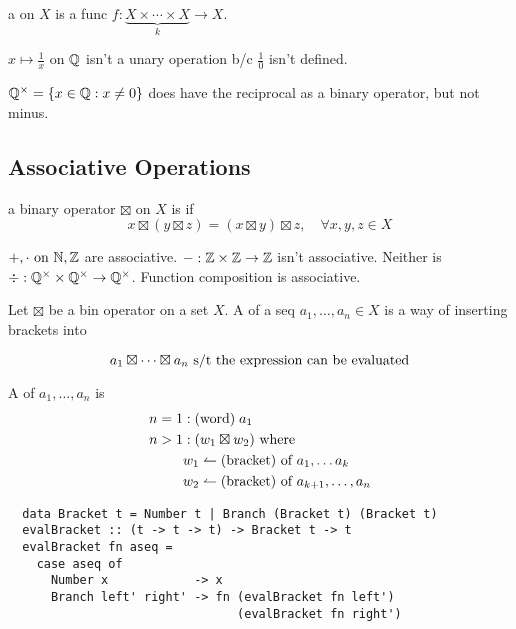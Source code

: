 \documentclass[12pt]{article}
\newcommand{\gop}[0]{\boxtimes}
\begin{document}
\bbox
\begin{defn}
  a  on \(X\) is a func \(f:\underset k{\underbrace{
  X\times\cdots\times X}}\to X\).
\end{defn}
\ebox

\bboxnote
\(x\mapsto\frac1x\) on \(\mathbb Q\) isn't a unary operation b/c \(\frac10\) isn't
defined.

\(\mathbb Q^\times=\{x\in\mathbb Q:x\neq 0\}\) does have the reciprocal as a binary operator,
but not minus.
\ebox

\subsection{Associative Operations}

\bbox
\begin{defn}
  a binary operator \(\gop\) on \(X\) is  if 
  \[x\gop(y\gop z)=(x\gop y)\gop z,\quad\forall x,y,z\in X\]
\end{defn}
\ebox

\bboxnote
\(+,\cdot\text{ on }\mathbb N,\mathbb Z\) are associative. \(-:\mathbb Z\times\mathbb Z\to\mathbb Z\) isn't
associative. Neither is \(\div:\mathbb Q^\times\times\mathbb Q^\times\to\mathbb Q^\times\). Function
composition is associative.
\ebox

\bbox
\begin{defn}
  Let \(\gop\) be a bin operator on a set \(X\). A  of a seq
  \(a_1,\dots,a_n\in X\) is a way of inserting brackets into
\end{defn}
\[a_1\gop\cdots\gop a_n\st\T{the expression can be evaluated}\]
\ebox


\bbox
\begin{defn}[Bracketing]
  A  of \(a_1,\dots,a_n\) is
  \begin{equation*}
    \begin{split}
      n=1 &:\TM{word}\;a_1\\
      n>1 &:(w_1\gop w_2)\T{ where}\\
          &w_1\is\TM{bracket}\T{ of }a_1,\dots a_k\\
          &w_2\is\TM{bracket}\T{ of }a_{k+1},\dots,a_n
    \end{split}
  \end{equation*}
\end{defn}
\ebox

\begin{tcolorbox}[colback=red!20!white,colframe=red]
  \begin{verbatim}
  data Bracket t = Number t | Branch (Bracket t) (Bracket t) 
  evalBracket :: (t -> t -> t) -> Bracket t -> t
  evalBracket fn aseq =
    case aseq of
      Number x            -> x
      Branch left' right' -> fn (evalBracket fn left')
                                (evalBracket fn right')\end{verbatim}
\end{tcolorbox}
\end{document}
